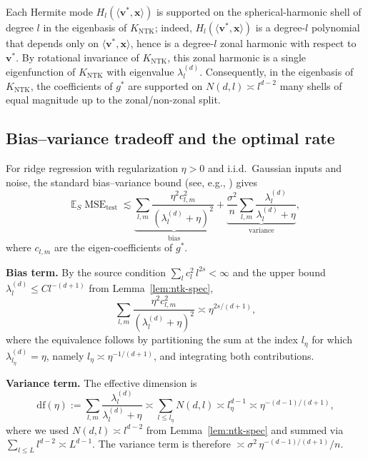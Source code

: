 \documentclass[12pt]{amsart}
\theoremstyle{definition}
\theoremstyle{remark}
\DeclareMathOperator{\MSE}{MSE}
\newcommand{\E}{\mathbb{E}}
\newcommand{\bx}{\mathbf{x}}
\newcommand{\bv}{\mathbf{v}}
\begin{document}
Each Hermite mode $H_{l}(\langle \bv^{*}, \bx\rangle)$ is supported on the
spherical-harmonic shell of degree $l$ in the eigenbasis of $K_{\mathrm{NTK}}$;
indeed, $H_{l}(\langle \bv^{*}, \bx\rangle)$ is a degree-$l$ polynomial
that depends only on $\langle\bv^{*},\bx\rangle$, hence is a degree-$l$
zonal harmonic with respect to $\bv^{*}$. By rotational invariance of
$K_{\mathrm{NTK}}$, this zonal harmonic is a single eigenfunction of
$K_{\mathrm{NTK}}$ with eigenvalue $\lambda_{l}^{(d)}$. Consequently,
in the eigenbasis of $K_{\mathrm{NTK}}$, the coefficients of $g^{*}$ are
supported on $N(d,l) \asymp l^{d-2}$ many shells of equal magnitude up to
the zonal/non-zonal split.

\subsection{Bias--variance tradeoff and the optimal rate}

For ridge regression with regularization $\eta > 0$ and i.i.d.\ Gaussian
inputs and noise, the standard bias--variance bound (see, e.g.,
\cite[Section~2]{RZ2019}) gives
\begin{equation}\label{eq:bv}
  \E_{S} \MSE_{\mathrm{test}}
  \lesssim \underbrace{\sum_{l,m} \frac{\eta^{2} c_{l,m}^{2}}{(\lambda_{l}^{(d)} + \eta)^{2}}}_{\text{bias}}
  + \underbrace{\frac{\sigma^{2}}{n} \sum_{l,m} \frac{\lambda_{l}^{(d)}}{\lambda_{l}^{(d)} + \eta}}_{\text{variance}},
\end{equation}
where $c_{l,m}$ are the eigen-coefficients of $g^{*}$.

\textbf{Bias term.}
By the source condition $\sum_{l} c_{l}^{2}\, l^{2s} < \infty$ and the
upper bound $\lambda_{l}^{(d)} \leq C l^{-(d+1)}$ from
Lemma~\ref{lem:ntk-spec},
\[
  \sum_{l,m} \frac{\eta^{2} c_{l,m}^{2}}{(\lambda_{l}^{(d)} + \eta)^{2}}
  \asymp \eta^{2s/(d+1)},
\]
where the equivalence follows by partitioning the sum at the index
$l_{\eta}$ for which $\lambda_{l_{\eta}}^{(d)} = \eta$, namely
$l_{\eta} \asymp \eta^{-1/(d+1)}$, and integrating both contributions.

\textbf{Variance term.}
The effective dimension is
\[
  \mathrm{df}(\eta) := \sum_{l,m} \frac{\lambda_{l}^{(d)}}{\lambda_{l}^{(d)}+\eta}
  \asymp \sum_{l \leq l_{\eta}} N(d,l)
  \asymp l_{\eta}^{d-1}
  \asymp \eta^{-(d-1)/(d+1)},
\]
where we used $N(d,l) \asymp l^{d-2}$ from Lemma~\ref{lem:ntk-spec} and
summed via $\sum_{l \leq L} l^{d-2} \asymp L^{d-1}$. The variance term is
therefore $\asymp \sigma^{2}\, \eta^{-(d-1)/(d+1)}/n$.
\end{document}
